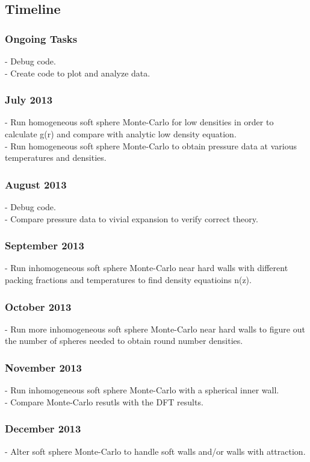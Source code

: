 \documentclass[a4paper,12pt]{article}
\begin{document}
\subsection*{Timeline}

\subsubsection*{Ongoing Tasks}
- Debug code.\\
- Create code to plot and analyze data.

\subsubsection*{July 2013}
- Run homogeneous soft sphere Monte-Carlo for low densities in order to
calculate g(r) and compare with analytic low density equation.\\
- Run homogeneous soft sphere Monte-Carlo to obtain pressure data at
various temperatures and densities.

\subsubsection*{August 2013}
- Debug code.\\
- Compare pressure data to vivial expansion to verify correct theory.

\subsubsection*{September 2013}
- Run inhomogeneous soft sphere Monte-Carlo near hard walls with
different packing fractions and temperatures to find density
equatioins n(z).

\subsubsection*{October 2013}
- Run more inhomogeneous soft sphere Monte-Carlo near hard walls to
figure out the number of spheres needed to obtain round number
densities.

\subsubsection*{November 2013}
- Run inhomogeneous soft sphere Monte-Carlo with a spherical inner
wall.\\
- Compare Monte-Carlo resutls with the DFT results.

\subsubsection*{December 2013}
- Alter soft sphere Monte-Carlo to handle soft walls and/or walls with
attraction.
\end{document}

